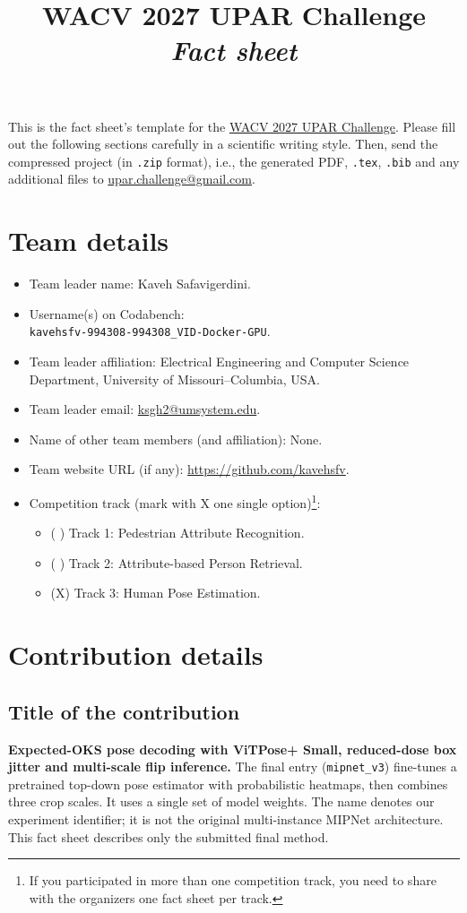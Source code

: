 \documentclass[a4paper,10pt,conference]{ieeeconf}
\title{WACV 2027 UPAR Challenge\\ \textit{Fact sheet}}
\begin{document}
\maketitle
This is the fact sheet's template for the \href{https://vap.aau.dk/rws/challenge/}{WACV 2027 UPAR Challenge}. Please fill out the following sections carefully in a scientific writing style. Then, send the compressed project (in \texttt{.zip} format), i.e., the generated PDF, \texttt{.tex}, \texttt{.bib} and any additional files to \url{upar.challenge@gmail.com}.

\section{Team details}\label{teamdetails}
\begin{itemize}
\item Team leader name: Kaveh Safavigerdini.
\item Username(s) on Codabench: \\ \texttt{kavehsfv-994308-994308\_VID-Docker-GPU}.
\item Team leader affiliation: Electrical Engineering and Computer Science Department, University of Missouri--Columbia, USA.
\item Team leader email: \url{ksgh2@umsystem.edu}.
\item Name of other team members (and affiliation): None.
\item Team website URL (if any): \url{https://github.com/kavehsfv}.
\item Competition track (mark with X one single option)\footnote{If you participated in more than one competition track, you need to share with the organizers one fact sheet per track.}:
\begin{itemize}
\item ( ) Track 1: Pedestrian Attribute Recognition.
\item ( ) Track 2: Attribute-based Person Retrieval.
\item (X) Track 3: Human Pose Estimation.
\end{itemize}
\end{itemize}

\section{Contribution details}
\subsection{Title of the contribution}
\textbf{Expected-OKS pose decoding with ViTPose+ Small, reduced-dose box jitter and multi-scale flip inference.}
The final entry (\texttt{mipnet\_v3}) fine-tunes a pretrained top-down pose estimator with probabilistic heatmaps, then combines three crop scales. It uses a single set of model weights. The name denotes our experiment identifier; it is not the original multi-instance MIPNet architecture. This fact sheet describes only the submitted final method.
\end{document}
